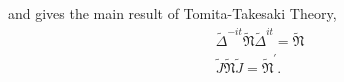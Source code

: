 \documentclass{article}
\begin{document}
and gives the main result of Tomita-Takesaki Theory,
\begin{equation}
\begin{split}
\tilde{\Delta}^{-it}\tilde{\mathfrak{N}}\tilde{\Delta}^{it}=\tilde{\mathfrak{N}}\\
\tilde{J}\tilde{\mathfrak{N}}\tilde{J}=\tilde{\mathfrak{N}}^\prime.
\end{split}
\end{equation}


\end{document}
